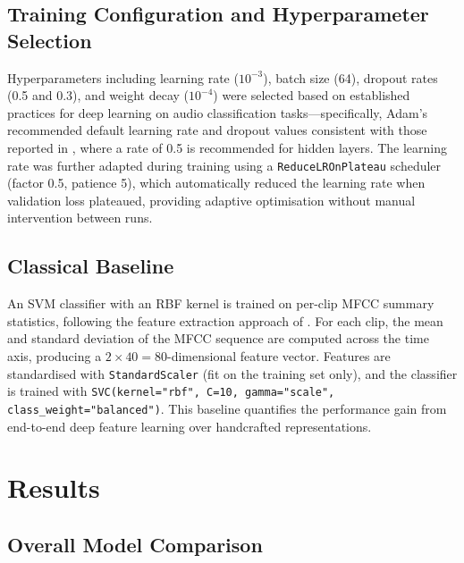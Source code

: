 \documentclass[12pt, a4paper]{article}
\begin{document}
\subsection{Training Configuration and Hyperparameter Selection}
\label{subsec:hyperparams}

Hyperparameters including learning rate ($10^{-3}$), batch size (64), dropout rates
(0.5 and 0.3), and weight decay ($10^{-4}$) were selected based on established
practices for deep learning on audio classification tasks---specifically, Adam's
recommended default learning rate \citep{kingma2014adam} and dropout values consistent
with those reported in \citet{srivastava2014dropout}, where a rate of 0.5 is recommended
for hidden layers. The learning rate was further adapted during training using a
\texttt{ReduceLROnPlateau} scheduler (factor 0.5, patience 5), which automatically
reduced the learning rate when validation loss plateaued, providing adaptive
optimisation without manual intervention between runs.

\subsection{Classical Baseline}

An SVM classifier with an RBF kernel is trained on per-clip MFCC summary statistics,
following the feature extraction approach of \citet{tzanetakis2002musical}. For each
clip, the mean and standard deviation of the MFCC sequence are computed across the time
axis, producing a $2 \times 40 = 80$-dimensional feature vector. Features are
standardised with \texttt{StandardScaler} (fit on the training set only), and the
classifier is trained with \texttt{SVC(kernel="rbf", C=10, gamma="scale",
class\_weight="balanced")}. This baseline quantifies the performance gain from
end-to-end deep feature learning over handcrafted representations.

\section{Results}
\label{sec:results}

\subsection{Overall Model Comparison}
\label{subsec:overall}
\end{document}
